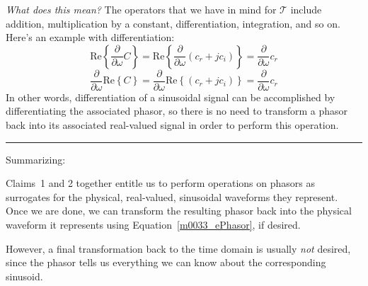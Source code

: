 \emph{What does this mean?} 
The operators that we have in mind for $\mathcal{T}$ include addition, multiplication by a constant, differentiation, integration, and so on.  
Here's an example with differentiation:
%
\begin{equation}
\mbox{Re}\left\{ \frac{\partial}{\partial \omega} C \right\}  
= \mbox{Re}\left\{ \frac{\partial}{\partial \omega} (c_r + jc_i) \right\} 
= \frac{\partial}{\partial \omega} c_r
\nonumber
\end{equation}
%
\begin{equation}
\frac{\partial}{\partial \omega} \mbox{Re}\left\{ C \right\}  
= \frac{\partial}{\partial \omega} \mbox{Re}\left\{ (c_r + jc_i) \right\} 
= \frac{\partial}{\partial \omega} c_r
\nonumber
\end{equation}
%
In other words, differentiation of a sinusoidal signal can be accomplished by differentiating the associated phasor, so there is no need to transform a phasor back into its associated real-valued signal in order to perform this operation.

\rule{3in}{1pt}
      
\vfill\break %

Summarizing:
%
\begin{mdframed}[backgroundcolor=yellow!20,nobreak=true] 
Claims~1 and 2 together entitle us to perform operations on phasors as surrogates for the physical, real-valued, sinusoidal waveforms they represent.  Once we are done, we can transform the resulting phasor back into the physical waveform it represents using Equation~\ref{m0033_ePhasor}, if desired.
\end{mdframed}
%
However, a final transformation back to the time domain is usually \emph{not} desired, since the phasor tells us everything we can know about the corresponding sinusoid.

